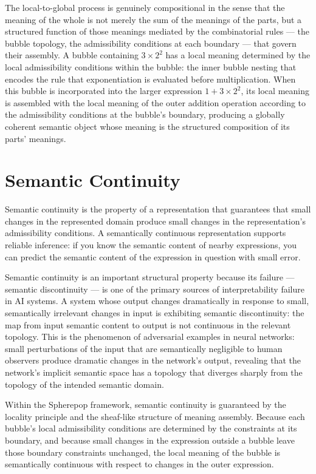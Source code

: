 \documentclass[12pt,openany]{book}
\theoremstyle{plain}
\theoremstyle{definition}
\theoremstyle{remark}
\begin{document}
The local-to-global process is genuinely compositional in the sense that the meaning of the whole is not merely the sum of the meanings of the parts, but a structured function of those meanings mediated by the combinatorial rules — the bubble topology, the admissibility conditions at each boundary — that govern their assembly. A bubble containing $3 \times 2^2$ has a local meaning determined by the local admissibility conditions within the bubble: the inner bubble nesting that encodes the rule that exponentiation is evaluated before multiplication. When this bubble is incorporated into the larger expression $1 + 3 \times 2^2$, its local meaning is assembled with the local meaning of the outer addition operation according to the admissibility conditions at the bubble's boundary, producing a globally coherent semantic object whose meaning is the structured composition of its parts' meanings.

\section{Semantic Continuity}

Semantic continuity is the property of a representation that guarantees that small changes in the represented domain produce small changes in the representation's admissibility conditions. A semantically continuous representation supports reliable inference: if you know the semantic content of nearby expressions, you can predict the semantic content of the expression in question with small error.

Semantic continuity is an important structural property because its failure — semantic discontinuity — is one of the primary sources of interpretability failure in AI systems. A system whose output changes dramatically in response to small, semantically irrelevant changes in input is exhibiting semantic discontinuity: the map from input semantic content to output is not continuous in the relevant topology. This is the phenomenon of adversarial examples in neural networks: small perturbations of the input that are semantically negligible to human observers produce dramatic changes in the network's output, revealing that the network's implicit semantic space has a topology that diverges sharply from the topology of the intended semantic domain.

Within the Spherepop framework, semantic continuity is guaranteed by the locality principle and the sheaf-like structure of meaning assembly. Because each bubble's local admissibility conditions are determined by the constraints at its boundary, and because small changes in the expression outside a bubble leave those boundary constraints unchanged, the local meaning of the bubble is semantically continuous with respect to changes in the outer expression.
\end{document}
